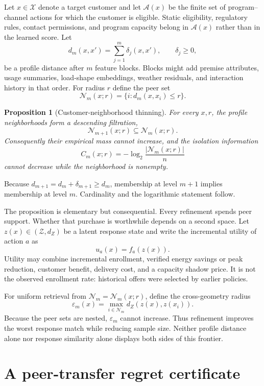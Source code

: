\documentclass[11pt]{article}
\makeatletter
\theoremstyle{noteplain}
\newtheorem{proposition}[theorem]{Proposition}
\theoremstyle{definition}
\renewenvironment{proof}[1][\proofname]{\par
  \pushQED{\qed}%
  \normalfont \topsep6\p@\@plus6\p@\relax
  \trivlist
  \item[\hskip\labelsep\bfseries #1\@addpunct{.}]\ignorespaces
}{%
  \popQED\endtrivlist\@endpefalse
}
\newcommand{\cA}{\mathcal A}
\newcommand{\cN}{\mathcal N}
\newcommand{\cX}{\mathcal X}
\makeatother
\begin{document}
Let $x\in\cX$ denote a target customer and let $\cA(x)$ be the finite set of program--channel actions for which the customer is eligible.  Static eligibility, regulatory rules, contact permissions, and program capacity belong in $\cA(x)$ rather than in the learned score.  Let
\[
 d_m(x,x')=\sum_{j=1}^{m}\delta_j(x,x'),\qquad \delta_j\geq0,
\]
be a profile distance after $m$ feature blocks.  Blocks might add premise attributes, usage summaries, load-shape embeddings, weather residuals, and interaction history in that order.  For radius $r$ define the peer set
\[
 \cN_m(x;r)=\{i:d_m(x,x_i)\leq r\}.
\]

\begin{proposition}[Customer-neighborhood thinning]\label{prop:thin}
For every $x,r$, the profile neighborhoods form a descending filtration,
\[
 \cN_{m+1}(x;r)\subseteq\cN_m(x;r).
\]
Consequently their empirical mass cannot increase, and the isolation information
\[
 C_m(x;r)=-\log_2\frac{|\cN_m(x;r)|}{n}
\]
cannot decrease while the neighborhood is nonempty.
\end{proposition}

\begin{proof}
Because $d_{m+1}=d_m+\delta_{m+1}\geq d_m$, membership at level $m+1$ implies membership at level $m$.  Cardinality and the logarithmic statement follow.
\end{proof}

The proposition is elementary but consequential.  Every refinement spends peer support.  Whether that purchase is worthwhile depends on a second space.  Let $z(x)\in(\mathcal Z,d_Z)$ be a latent response state and write the incremental utility of action $a$ as
\[
 u_a(x)=f_a(z(x)).
\]
Utility may combine incremental enrollment, verified energy savings or peak reduction, customer benefit, delivery cost, and a capacity shadow price.  It is not the observed enrollment rate: historical offers were selected by earlier policies.

For uniform retrieval from $\cN_m=\cN_m(x;r)$, define the cross-geometry radius
\[
 \varepsilon_m(x)=\max_{i\in\cN_m}d_Z(z(x),z(x_i)).
\]
Because the peer sets are nested, $\varepsilon_m$ cannot increase.  Thus refinement improves the worst response match while reducing sample size.  Neither profile distance alone nor response similarity alone displays both sides of this frontier.

\section{A peer-transfer regret certificate}
\end{document}
